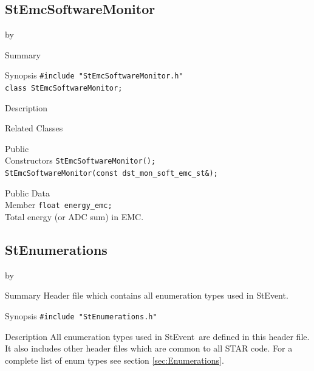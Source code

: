 \documentclass[twoside]{article}
\newcommand{\StEvent}{\textsf{StEvent}}
\newcommand{\entrylabel}[1]{\mbox{\textbf{{#1}}}\hfil}%
\newenvironment{entry}
{\begin{list}{}%
    {\renewcommand{\makelabel}{\entrylabel}%
     \setlength{\labelwidth}{90pt}%
     \setlength{\leftmargin}{\labelwidth}
     \advance\leftmargin by \labelsep%
      }%
    }%
  {\end{list}}
\newcommand{\Entrylabel}[1]%
{\raisebox{0pt}[1ex][0pt]{\makebox[\labelwidth][l]%
    {\parbox[t]{\labelwidth}{\hspace{0pt}\textbf{{#1}}}}}}
\newenvironment{Entry}%
{\renewcommand{\entrylabel}{\Entrylabel}\begin{entry}}%
  {\end{entry}}
\begin{document}
\subsection{StEmcSoftwareMonitor}
\label{sec:StEmcSoftwareMonitor}
\begin{Entry}
\item[Summary]
\item[Synopsis]
    \verb+#include "StEmcSoftwareMonitor.h"+\\
    \verb+class StEmcSoftwareMonitor;+\\
\item[Description]
\item[Related Classes]
\item[Public\\ Constructors]
    \verb+StEmcSoftwareMonitor();+\\
    \verb+StEmcSoftwareMonitor(const dst_mon_soft_emc_st&);+\\
\item[Public Data\\ Member]
    \verb+float energy_emc;+\\
    Total energy (or ADC sum) in EMC.
\end{Entry}
\clearpage


\subsection{StEnumerations}
\label{sec:StEnumerations}
\begin{Entry}
\item[Summary] Header file which contains all enumeration types used
    in \StEvent.
\item[Synopsis]
    \verb+#include "StEnumerations.h"+\\
\item[Description] All enumeration types used in \StEvent\ are defined
    in this header file. It also includes other header files which are
    common to all STAR code. For a complete list of enum types see
    section \ref{sec:Enumerations}.
\end{Entry}
\clearpage
\end{document}
